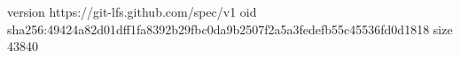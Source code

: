 version https://git-lfs.github.com/spec/v1
oid sha256:49424a82d01dff1fa8392b29fbc0da9b2507f2a5a3fedefb55c45536fd0d1818
size 43840
